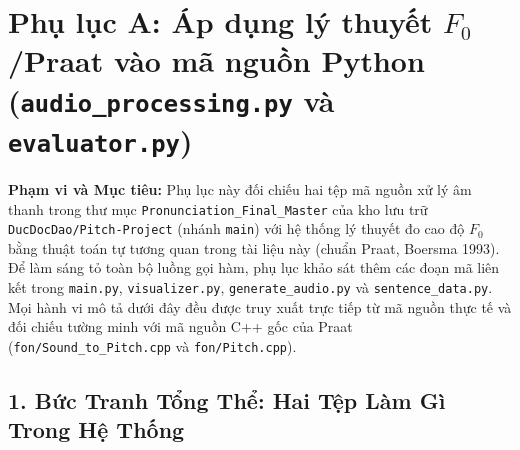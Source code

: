 \documentclass[11pt,a4paper]{article}
\begin{document}
\newpage


\clearpage
{}
{}
\renewcommand{\contentsname}{Mục lục}
\setcounter{tocdepth}{1}
\tableofcontents
\clearpage

















\section*{Phụ lục A: Áp dụng lý thuyết $F_0$/Praat vào mã nguồn Python\\(\texttt{audio\_processing.py} và \texttt{evaluator.py})}

\begin{learningobj}
\textbf{Phạm vi và Mục tiêu:} Phụ lục này đối chiếu hai tệp mã nguồn xử lý âm thanh trong thư mục \texttt{Pronunciation\_Final\_Master} của kho lưu trữ \texttt{DucDocDao/Pitch-Project} (nhánh \texttt{main}) với hệ thống lý thuyết đo cao độ $F_0$ bằng thuật toán tự tương quan trong tài liệu này (chuẩn Praat, Boersma 1993). Để làm sáng tỏ toàn bộ luồng gọi hàm, phụ lục khảo sát thêm các đoạn mã liên kết trong \texttt{main.py}, \texttt{visualizer.py}, \texttt{generate\_audio.py} và \texttt{sentence\_data.py}. Mọi hành vi mô tả dưới đây đều được truy xuất trực tiếp từ mã nguồn thực tế và đối chiếu tường minh với mã nguồn C++ gốc của Praat (\texttt{fon/Sound\_to\_Pitch.cpp} và \texttt{fon/Pitch.cpp}).
\end{learningobj}

\subsection*{1. Bức Tranh Tổng Thể: Hai Tệp Làm Gì Trong Hệ Thống}
\end{document}
